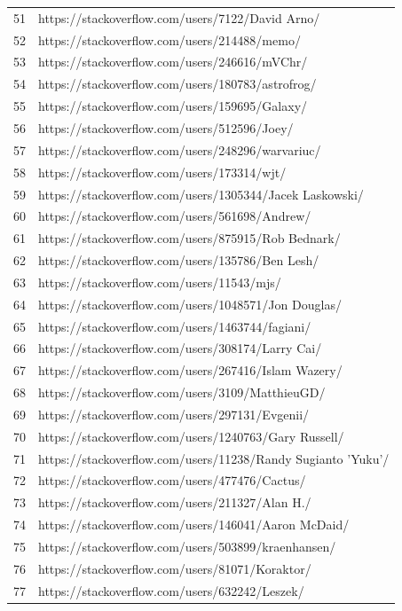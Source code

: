 \begin{center}
\begin{longtable}{|p{1.5cm}|p{12.5cm}|}
51 & https://stackoverflow.com/users/7122/David Arno/ \\
52 & https://stackoverflow.com/users/214488/memo/ \\
53 & https://stackoverflow.com/users/246616/mVChr/ \\
54 & https://stackoverflow.com/users/180783/astrofrog/ \\
55 & https://stackoverflow.com/users/159695/Galaxy/ \\
56 & https://stackoverflow.com/users/512596/Joey/ \\
57 & https://stackoverflow.com/users/248296/warvariuc/ \\
58 & https://stackoverflow.com/users/173314/wjt/ \\
59 & https://stackoverflow.com/users/1305344/Jacek Laskowski/ \\
60 & https://stackoverflow.com/users/561698/Andrew/ \\
61 & https://stackoverflow.com/users/875915/Rob Bednark/ \\
62 & https://stackoverflow.com/users/135786/Ben Lesh/ \\
63 & https://stackoverflow.com/users/11543/mjs/ \\
64 & https://stackoverflow.com/users/1048571/Jon Douglas/ \\
65 & https://stackoverflow.com/users/1463744/fagiani/ \\
66 & https://stackoverflow.com/users/308174/Larry Cai/ \\
67 & https://stackoverflow.com/users/267416/Islam Wazery/ \\
68 & https://stackoverflow.com/users/3109/MatthieuGD/ \\
69 & https://stackoverflow.com/users/297131/Evgenii/ \\
70 & https://stackoverflow.com/users/1240763/Gary Russell/ \\
71 & https://stackoverflow.com/users/11238/Randy Sugianto 'Yuku'/ \\
72 & https://stackoverflow.com/users/477476/Cactus/ \\
73 & https://stackoverflow.com/users/211327/Alan H./ \\
74 & https://stackoverflow.com/users/146041/Aaron McDaid/ \\
75 & https://stackoverflow.com/users/503899/kraenhansen/ \\
76 & https://stackoverflow.com/users/81071/Koraktor/ \\
77 & https://stackoverflow.com/users/632242/Leszek/ \\

\end{longtable}
\end{center}
